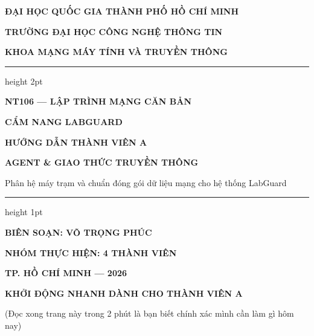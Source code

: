 \documentclass[12pt,a4paper]{article}
\begin{document}
\begin{titlepage}
  \centering
  \vspace*{-10mm}
  {\bfseries\large ĐẠI HỌC QUỐC GIA THÀNH PHỐ HỒ CHÍ MINH\par}
  {\bfseries\large TRƯỜNG ĐẠI HỌC CÔNG NGHỆ THÔNG TIN\par}
  {\bfseries\large KHOA MẠNG MÁY TÍNH VÀ TRUYỀN THÔNG\par}
  \vspace{15mm}
  {\color{lgDeepBlue}\hrule height 2pt}
  \vspace{12mm}
  {\bfseries\large NT106 — LẬP TRÌNH MẠNG CĂN BẢN\par}
  \vspace{12mm}
  {\bfseries\huge\color{lgDeepBlue} CẨM NANG LABGUARD\par}
  \vspace{5mm}
  {\bfseries\Huge\color{lgDeepBlue} HƯỚNG DẪN THÀNH VIÊN A\par}
  \vspace{8mm}
  {\bfseries\Large AGENT \& GIAO THỨC TRUYỀN THÔNG\par}
  \vspace{4mm}
  {\large Phân hệ máy trạm và chuẩn đóng gói dữ liệu mạng cho hệ thống LabGuard\par}
  \vspace{12mm}
  {\color{lgTeal}\hrule height 1pt}
  \vspace{25mm}
  {\large\textbf{BIÊN SOẠN: VÕ TRỌNG PHÚC}\par}
  \vspace{6mm}
  {\large\textbf{NHÓM THỰC HIỆN: 4 THÀNH VIÊN}\par}
  \vfill
  {\bfseries\color{lgSlate} TP. HỒ CHÍ MINH — 2026\par}
\end{titlepage}

\thispagestyle{empty}
\vspace*{-8mm}
{\centering\Large\bfseries\color{lgDeepBlue} KHỞI ĐỘNG NHANH DÀNH CHO THÀNH VIÊN A\par}
\vspace{1mm}
{\centering\footnotesize\color{lgGray} (Đọc xong trang này trong 2 phút là bạn biết chính xác mình cần làm gì hôm nay)\par}
\vspace{4mm}
\end{document}
